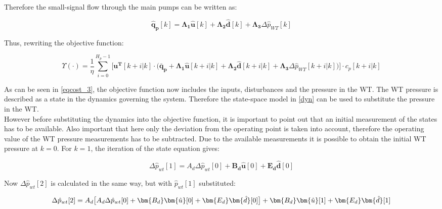 Therefore the small-signal flow through the main pumps can be written as: 

 \begin{equation}
 \bm{\hat{q}_{p}}[k] =   \bm{\Lambda_1} \bm{\hat{u}}[k] + \bm{\Lambda_2} \bm{\hat{d}}[k] + \bm{\Lambda_3} \Delta \hat{p}_{WT}[k]
 \label{pumpflows_simplified}
\end{equation}

Thus, rewriting the objective function:

\begin{equation}
 \Upsilon(\cdot) = \frac{1}{\eta} \sum_{i=0}^{H_p-1} \Big[ \bm{u^T}[k+i|k] \cdot \Big(\bm{\bar{q}_p} +  \bm{\Lambda_1} \bm{\hat{u}}[k+i|k] + \bm{\Lambda_2} \bm{\hat{d}}[k+i|k] + \bm{\Lambda_3} \Delta \hat{p}_{WT}[k+i|k]\Big)\Big]  \cdot c_p[k+i|k]
\label{eqcost_3} 
\end{equation}

As can be seen in \eqref{eqcost_3}, the objective function now includes the inputs, disturbances and the pressure in the WT. The WT pressure is described as a state in the dynamics governing the system. Therefore the state-space model in \eqref{dyn} can be used to substitute the pressure in the WT. 
\\
However before substituting the dynamics into the objective function, it is important to point out that an initial measurement of the states has to be available. Also important that here only the deviation from the operating point is taken into account, therefore the operating value of the WT pressure measurements has to be subtracted. Due to the available measurements it is possible to obtain the initial WT pressure at $k = 0$. For $k=1$, the iteration of the state equation gives:


\begin{equation}
	\Delta \hat p_{wt}[1] = A_d\Delta \hat p_{wt}[0] + \bm{B_d} \bm{\hat{u}}[0] + \bm{E_d} \bm{\hat{d}}[0]
\end{equation}

Now $\Delta \hat p_{wt}[2]$ is calculated in the same way, but with $\hat p_{wt}[1]$ substituted: 

\begin{equation}
	\Delta \hat p_{wt}[2] = A_d\big[A_d\Delta \hat p_{wt}[0] + \bm{B_d}  \bm{\hat{u}}[0] + \bm{E_d}  \bm{\hat{d}}[0]\big] + \bm{B_d} \bm{\hat{u}}[1] + \bm{E_d} \bm{\hat{d}}[1]\\ 
\end{equation}

